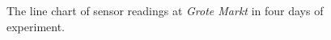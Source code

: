 \begin{figure}[H]
\begin{adjustwidth}{-2cm}{}
{{    }
  }
  \end{adjustwidth}
  \caption[The line chart of sensor readings at Grote Markt.]
  {The line chart of sensor readings at \textit{Grote Markt} in four days of experiment.}
  \label{fig:result-grotemarkt-line-chart}
\end{figure}

